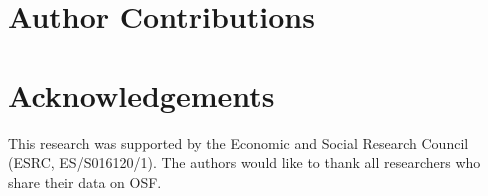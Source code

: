 \documentclass[11pt, twoside, twocolumn]{article}
\begin{document}
\section{Author Contributions}


\section{Acknowledgements}

This research was supported by the Economic and Social Research Council (ESRC, ES/S016120/1). The authors would like to thank all researchers who share their data on OSF. 

\small
 

\normalsize
\end{document}
